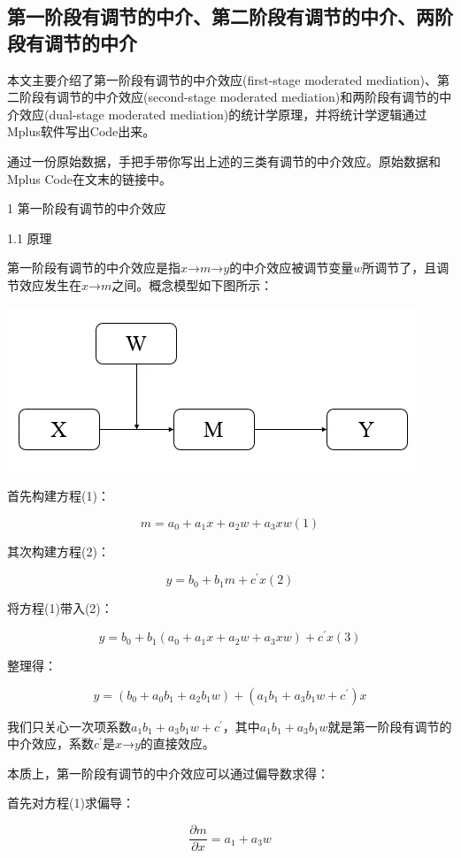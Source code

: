 \documentclass[
]{book}
\begin{document}
\hypertarget{firstmome}{%
\subsection{第一阶段有调节的中介、第二阶段有调节的中介、两阶段有调节的中介}\label{firstmome}}

本文主要介绍了第一阶段有调节的中介效应(first-stage moderated mediation)、第二阶段有调节的中介效应(second-stage moderated mediation)和两阶段有调节的中介效应(dual-stage moderated mediation)的统计学原理，并将统计学逻辑通过Mplus软件写出Code出来。

通过一份原始数据，手把手带你写出上述的三类有调节的中介效应。原始数据和Mplus Code在文末的链接中。

1 第一阶段有调节的中介效应

1.1 原理

第一阶段有调节的中介效应是指\(x\)→\(m\)→\(y\)的中介效应被调节变量\(w\)所调节了，且调节效应发生在\(x\)→\(m\)之间。概念模型如下图所示：

\includegraphics{figs/1141.png}

首先构建方程(1)：

\[
m=a_{0}+a_{1}x+a_{2}w+a_{3}xw(1)
\]

其次构建方程(2)：

\[
y=b_{0}+b_{1}m+c^{'}x(2)
\]

将方程(1)带入(2)：

\[
y=b_{0}+b_{1}(a_{0}+a_{1}x+a_{2}w+a_{3}xw)+c^{'}x(3)
\]

整理得：

\[
y=(b_{0}+a_{0}b_{1}+a_{2}b_{1}w)+(a_{1}b_{1}+a_{3}b_{1}w+c^{'})x
\]

我们只关心一次项系数\(a_{1}b_{1}+a_{3}b_{1}w+c^{'}\)，其中\(a_{1}b_{1}+a_{3}b_{1}w\)就是第一阶段有调节的中介效应，系数\(c^{'}\)是\(x\)→\(y\)的直接效应。

本质上，第一阶段有调节的中介效应可以通过偏导数求得：

首先对方程(1)求偏导：

\[
\frac{\partial m}{\partial x}=a_{1}+a_{3}w
\]
\end{document}

